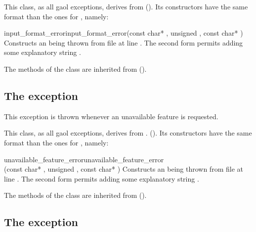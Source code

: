 \documentclass{manual}
\begin{document}
This class, as all gaol exceptions, derives from 
(). Its constructors have the same format
than the ones for , namely:

\begin{defmethod}{input\_format\_error}{}{input\_format\_error}{(const char* , unsigned , const char* )}
Constructs an  being thrown from file  at
line . The second form permits adding some explanatory string .
\end{defmethod}
The methods of the class are inherited from 
().

\subsection{The  exception}

This exception is thrown whenever an unavailable feature is requested.

This class, as all gaol exceptions, derives from .
(). Its constructors have the same format
than the ones for , namely:

\begin{defmethod}{unavailable\_feature\_error}{}{unavailable\_feature\_error}{\\\hbox{}\hfill (const char* , unsigned , const char* )}
Constructs an  being thrown from file  at
line . The second form permits adding some explanatory string .
\end{defmethod}

The methods of the class are inherited from  ().

\subsection{The  exception}
\end{document}
